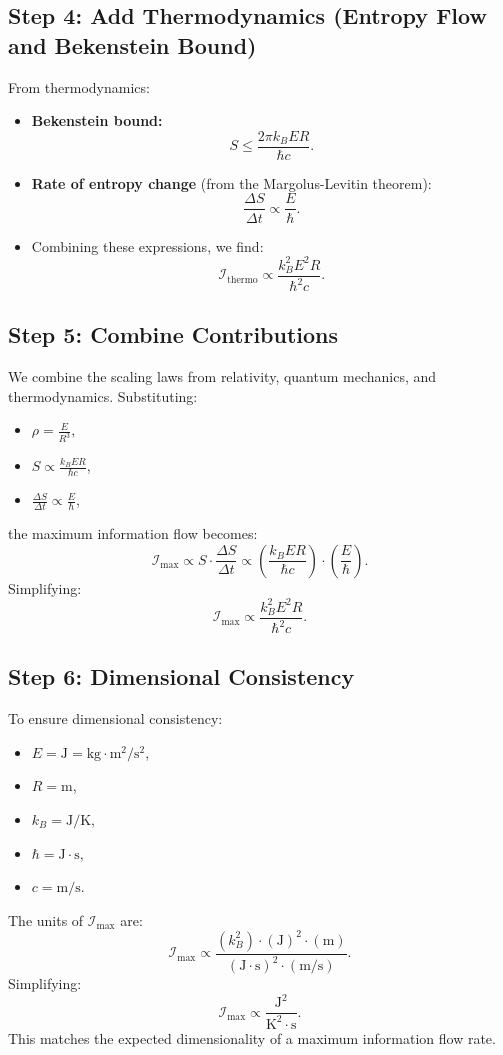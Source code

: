 \documentclass[12pt]{article}
\begin{document}
\subsection{Step 4: Add Thermodynamics (Entropy Flow and Bekenstein Bound)}

From thermodynamics:
\begin{itemize}
    \item \textbf{Bekenstein bound:}
    \[
    S \leq \frac{2 \pi k_B E R}{\hbar c}.
    \]

    \item \textbf{Rate of entropy change} (from the Margolus-Levitin theorem):
    \[
    \frac{\Delta S}{\Delta t} \propto \frac{E}{\hbar}.
    \]

    \item Combining these expressions, we find:
    \[
    \mathcal{I}_{\text{thermo}} \propto \frac{k_B^2 E^2 R}{\hbar^2 c}.
    \]
\end{itemize}

\subsection{Step 5: Combine Contributions}

We combine the scaling laws from relativity, quantum mechanics, and thermodynamics. Substituting:
\begin{itemize}
    \item $\rho = \frac{E}{R^3}$,
    \item $S \propto \frac{k_B E R}{\hbar c}$,
    \item $\frac{\Delta S}{\Delta t} \propto \frac{E}{\hbar}$,
\end{itemize}
the maximum information flow becomes:
\[
\mathcal{I}_{\text{max}} \propto S \cdot \frac{\Delta S}{\Delta t} \propto \left( \frac{k_B E R}{\hbar c} \right) \cdot \left( \frac{E}{\hbar} \right).
\]
Simplifying:
\[
\mathcal{I}_{\text{max}} \propto \frac{k_B^2 E^2 R}{\hbar^2 c}.
\]

\subsection{Step 6: Dimensional Consistency}

To ensure dimensional consistency:
\begin{itemize}
    \item $E = \text{J} = \text{kg} \cdot \text{m}^2 / \text{s}^2$,
    \item $R = \text{m}$,
    \item $k_B = \text{J/K}$,
    \item $\hbar = \text{J} \cdot \text{s}$,
    \item $c = \text{m/s}$.
\end{itemize}
The units of $\mathcal{I}_{\text{max}}$ are:
\[
\mathcal{I}_{\text{max}} \propto \frac{(k_B^2) \cdot (\text{J})^2 \cdot (\text{m})}{(\text{J} \cdot \text{s})^2 \cdot (\text{m/s})}.
\]
Simplifying:
\[
\mathcal{I}_{\text{max}} \propto \frac{\text{J}^2}{\text{K}^2 \cdot \text{s}}.
\]
This matches the expected dimensionality of a maximum information flow rate.
\end{document}

